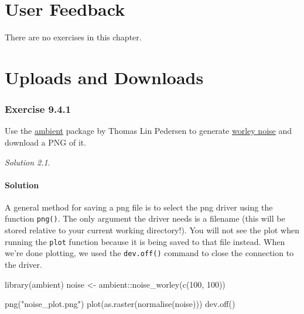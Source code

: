\documentclass[
]{book}
\newenvironment{Shaded}{\begin{snugshade}}{\end{snugshade}}
\newcommand{\DecValTok}[1]{\textcolor[rgb]{0.00,0.00,0.81}{#1}}
\newcommand{\FunctionTok}[1]{\textcolor[rgb]{0.00,0.00,0.00}{#1}}
\newcommand{\NormalTok}[1]{#1}
\newcommand{\OtherTok}[1]{\textcolor[rgb]{0.56,0.35,0.01}{#1}}
\newcommand{\SpecialCharTok}[1]{\textcolor[rgb]{0.00,0.00,0.00}{#1}}
\newcommand{\StringTok}[1]{\textcolor[rgb]{0.31,0.60,0.02}{#1}}
\theoremstyle{definition}
\theoremstyle{definition}
\theoremstyle{definition}
\theoremstyle{definition}
\theoremstyle{remark}
\newtheorem*{solution}{Solution}
\begin{document}
\hypertarget{user-feedback}{%
\chapter{User Feedback}\label{user-feedback}}

There are no exercises in this chapter.

\hypertarget{uploads-and-downloads}{%
\chapter{Uploads and Downloads}\label{uploads-and-downloads}}

\hypertarget{exercise-9.4.1}{%
\subsection*{Exercise 9.4.1}\label{exercise-9.4.1}}

Use the \href{https://ambient.data-imaginist.com}{ambient} package by Thomas Lin
Pedersen to generate \href{https://ambient.data-imaginist.com/reference/noise_worley.html}{worley noise}
and download a PNG of it.

\begin{solution}
\leavevmode

\hypertarget{solution-25}{%
\subsubsection*{Solution}\label{solution-25}}

A general method for saving a png file is to select the png driver using the
function \texttt{png()}. The only argument the driver needs is a filename (this will
be stored relative to your current working directory!). You will not see the
plot when running the \texttt{plot} function because it is being saved to that file
instead. When we're done plotting, we used the \texttt{dev.off()} command to close the
connection to the driver.

\begin{Shaded}
\begin{Highlighting}[]
\FunctionTok{library}\NormalTok{(ambient)}
\NormalTok{noise }\OtherTok{\textless{}{-}}\NormalTok{ ambient}\SpecialCharTok{::}\FunctionTok{noise\_worley}\NormalTok{(}\FunctionTok{c}\NormalTok{(}\DecValTok{100}\NormalTok{, }\DecValTok{100}\NormalTok{))}

\FunctionTok{png}\NormalTok{(}\StringTok{"noise\_plot.png"}\NormalTok{)}
\FunctionTok{plot}\NormalTok{(}\FunctionTok{as.raster}\NormalTok{(}\FunctionTok{normalise}\NormalTok{(noise)))}
\FunctionTok{dev.off}\NormalTok{()}
\end{Highlighting}
\end{Shaded}

\end{solution}
\end{document}
